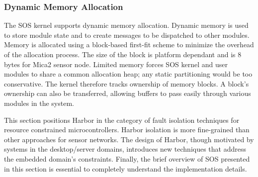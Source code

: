 \subsubsection{Dynamic Memory Allocation}
% 
The SOS kernel supports dynamic memory allocation.
% 
Dynamic memory is used to store module state and to create messages to
be dispatched to other modules. 
% 
Memory is allocated using a block-based first-fit scheme to minimize
the overhead of the allocation process.
%
The size of the block is platform dependant and is 8 bytes for Mica2
sensor node.
% 
Limited memory forces SOS kernel and user modules to share a common
allocation heap; any static partitioning would be too conservative.
% 
% 
The kernel therefore tracks ownership of memory blocks.
% 
A block's ownership can also be transferred, allowing
% 
buffers to pass easily through various modules in the system.
% 
% 



%
This section positions Harbor in the category of fault isolation
techniques for
resource constrained microcontrollers.
%
Harbor isolation is more fine-grained than other approaches for sensor
networks.
%
The design of Harbor, though motivated by systems in the
desktop/server domains, introduces new techniques that address the
embedded domain's constraints.
%
Finally, the brief overview of SOS presented in this section is
essential to completely understand the implementation details.

